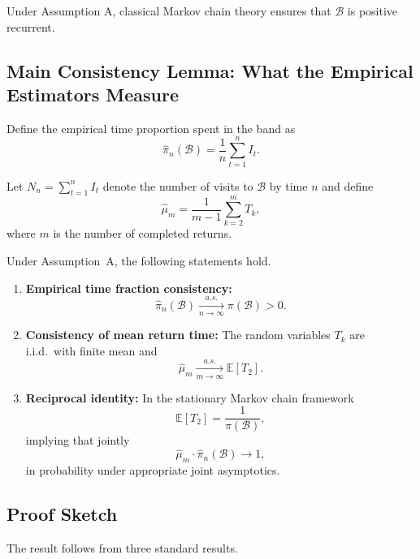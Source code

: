 \documentclass[11pt]{article}
\begin{document}
Under Assumption A, classical Markov chain theory ensures that $\mathcal{B}$ is positive recurrent.

\subsection{Main Consistency Lemma: What the Empirical Estimators Measure}

Define the empirical time proportion spent in the band as
\[
\widehat{\pi}_n(\mathcal{B}) = \frac{1}{n} \sum_{t=1}^{n} I_t.
\]

Let $N_n = \sum_{t=1}^{n} I_t$ denote the number of visits to $\mathcal{B}$ by time $n$ and define
\[
\widehat{\mu}_m = \frac{1}{m-1}\sum_{k=2}^{m} T_k,
\]
where $m$ is the number of completed returns.

\begin{lemma}\label{lem:recurrence}
Under Assumption~A, the following statements hold.

\begin{enumerate}
    \item \textbf{Empirical time fraction consistency:}
    \[
    \widehat{\pi}_n(\mathcal{B}) \xrightarrow[n \to \infty]{a.s.} \pi(\mathcal{B}) > 0.
    \]

    \item \textbf{Consistency of mean return time:}
    The random variables $T_k$ are i.i.d.\ with finite mean and
    \[
    \widehat{\mu}_m \xrightarrow[m\to\infty]{a.s.} 
    \mathbb{E}[T_2].
    \]

    \item \textbf{Reciprocal identity:}
    In the stationary Markov chain framework
    \[
    \mathbb{E}[T_2] = \frac{1}{\pi(\mathcal{B})},
    \]
    implying that jointly
    \[
    \widehat{\mu}_m \cdot \widehat{\pi}_n(\mathcal{B}) \to 1,
    \]
    in probability under appropriate joint asymptotics.
\end{enumerate}
\end{lemma}

\subsection*{Proof Sketch}

The result follows from three standard results.
\end{document}
